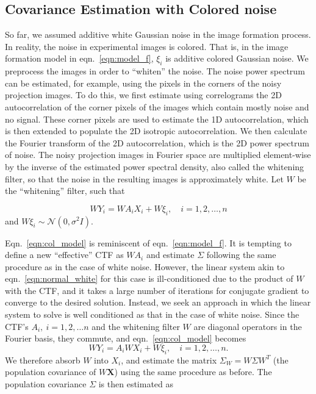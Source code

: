 \documentclass[review]{elsarticle}
\begin{document}
\subsection{Covariance Estimation with Colored noise}
\label{sec:covest_col}
So far, we assumed additive white Gaussian noise in the image formation 
process. In reality, the noise in experimental images
is colored. That is, in the image formation model in eqn.\ \ref{eqn:model_f},
$\xi_i$ is additive colored Gaussian noise. 
We preprocess the images in order to ``whiten'' the noise.
The noise power spectrum can be estimated, for example, using the pixels in the corners of the noisy projection images.
To do this, we first estimate using correlograms the 2D autocorrelation
of the corner pixels of the images which contain mostly noise and no signal. These corner
pixels are used to estimate the 1D autocorrelation, which is then extended to populate the 2D isotropic
autocorrelation. We then calculate the Fourier transform of the 2D autocorrelation, 
which is the 2D power spectrum of noise.
The noisy projection images in 
Fourier space are multiplied element-wise by the inverse of the estimated 
power spectral density, also called the whitening filter, so that the noise in the resulting images 
is approximately white.
Let $W$ be the ``whitening'' filter, such that

\begin{equation}
 WY_i=WA_{i}X_i + W\xi_i, \quad i=1,2,\ldots,n
 \label{eqn:col_model}
\end{equation}
and $W \xi_i \sim \mathcal{N}(0,\sigma^2 I)$. 

Eqn.\ \ref{eqn:col_model} is reminiscent of eqn.\ \ref{eqn:model_f}. It is tempting to define a new 
``effective'' CTF as $WA_{i}$ and estimate
$\Sigma$ following the same procedure as in the case of white noise. However, 
the linear system akin to eqn.\ \ref{eqn:normal_white} for this case
is ill-conditioned due to the product of $W$ with the CTF, and it 
takes a large number of iterations for conjugate gradient 
to converge to the desired solution. Instead, we seek an approach in which the 
linear system to solve is well conditioned as that
in the case of white noise.
Since the CTF's $A_i,\ i=1,2, \ldots n$ 
and the whitening filter $W$ are diagonal operators in the Fourier basis, they 
commute, and eqn.\ \ref{eqn:col_model} becomes
\begin{equation}
WY_i=A_{i}WX_i + W\xi_i, \quad i=1,2,\ldots,n.
\label{eqn:model_col}
\end{equation}
We therefore 
absorb $W$ into $X_i$, and estimate the matrix $\Sigma_W = 
W\Sigma W^T$ (the population covariance of $W \textbf{X}$) using the same procedure as before.
The population covariance $\Sigma$ is then estimated as
\end{document}
